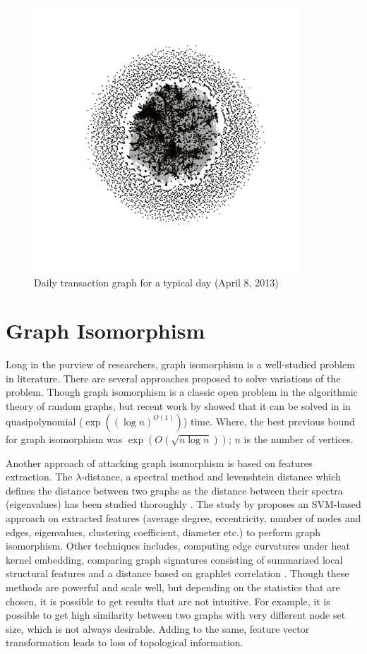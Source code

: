 \documentclass[12pt,a4paper]{article}
\numberwithin{equation}{section}
\numberwithin{figure}{section}
\numberwithin{table}{section}
\begin{document}
\begin{figure}[ht]
\begin{center}
\includegraphics[width= 100mm]{./figure/dt.png}
\caption{ Daily transaction graph for a typical day (April 8, 2013)}
\label{fig:dt}
\end{center}
\end{figure}

\section{Graph Isomorphism}
Long in the purview of researchers, graph isomorphism is a well-studied problem in literature. There are several approaches proposed to solve variations of the problem. Though graph isomorphism is a classic open problem in the algorithmic theory of random graphs, but recent work by \citet{Babai2015} showed that it can be solved in in quasipolynomial ($\exp\left((\log n)^{O(1)}\right)$) time. Where, the best previous bound for graph isomorphism was $\exp(O(\sqrt{n\log n}))$;  $n$ is the number of vertices.

Another approach of attacking graph isomorphism is based on features extraction. The $\lambda$-distance, a spectral method and levenshtein distance which defines the distance between two graphs as the distance between their spectra (eigenvalues) has been studied thoroughly \citep{Koutra2013}. The study by \citet{Li2012} proposes an SVM-based approach on extracted features (average degree, eccentricity, number of nodes and edges, eigenvalues, clustering coefficient, diameter etc.) to perform graph isomorphism. Other techniques includes, computing edge curvatures under heat kernel embedding, comparing graph signatures consisting of
summarized local structural features  and a distance based on graphlet correlation \citep{Koutra2013}. Though these methods are powerful and scale well, but depending
on the statistics that are chosen, it is possible to get results that are not intuitive. For example, it is possible to get high similarity between two graphs with very different node set size, which is not always desirable. Adding to the same, feature vector transformation leads to loss of topological information.
\end{document}
